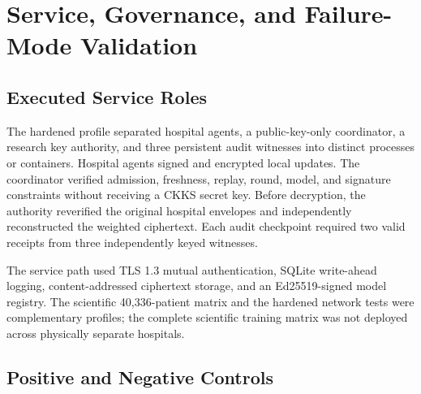 \chapter{Service, Governance, and Failure-Mode Validation}
\label{app:service-validation}

\section{Executed Service Roles}
\label{appsec:executed-service-roles}

The hardened profile separated hospital agents, a public-key-only coordinator, a research key authority, and three persistent audit witnesses into distinct processes or containers. Hospital agents signed and encrypted local updates. The coordinator verified admission, freshness, replay, round, model, and signature constraints without receiving a CKKS secret key. Before decryption, the authority reverified the original hospital envelopes and independently reconstructed the weighted ciphertext. Each audit checkpoint required two valid receipts from three independently keyed witnesses.

The service path used TLS 1.3 mutual authentication, SQLite write-ahead logging, content-addressed ciphertext storage, and an Ed25519-signed model registry. The scientific 40,336-patient matrix and the hardened network tests were complementary profiles; the complete scientific training matrix was not deployed across physically separate hospitals.

\section{Positive and Negative Controls}
\label{appsec:positive-negative-controls}

